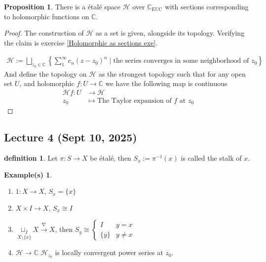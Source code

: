 \documentclass[10.5pt]{article}
\theoremstyle{definition}
\newtheorem{proposition}{Proposition}
\newtheorem{definition}{definition}
\newtheorem*{example}{Example(s)}
\newcommand{\set}[1]{\{#1\}}
\begin{document}
    \begin{proposition}\label{Holomorphic as sections}
            There is a \'etal\'e space \(\mathcal{H}\) over \(\mathbb{C}_\text{EUC}\) with sections corresponding to holomorphic functions on \(\mathbb{C}\).
    \end{proposition}
    \begin{proof}
        The construction of \(\mathcal{H}\) as a set is given, alongside its topology. Verifying the claim is exercise \ref{Holomorphic as sections exe}.
        
        \begin{align*}
            \mathcal{H} := \bigsqcup_{z_0 \in \mathbb{C}}\left\{\sum_1^\infty c_n(z-z_0)^n \mid \text{the series converges in some neighborhood of }z_0\right\}
        \end{align*}
        And define the topology on \(\mathcal{H}\) as the strongest topology such that for any open set \(U\), and holomorphic \(f: U \to \mathbb{C}\) we have the following map is continuous
        \begin{align*}
            \mathcal{H}f: U &\to \mathcal{H} \\
            z_0 &\mapsto \text{The Taylor expansion of }f \text{ at }z_0
        \end{align*}
    \end{proof}




    \subsection{Lecture 4 (Sept 10, 2025)}

    \begin{definition}
        Let \(\pi:S \to X\) be \'etal\'e, then \(S_x := \pi^{-1}(x)\) is called the stalk of \(x\).
    \end{definition}

    \begin{example}
        \begin{enumerate}
            \item \(1: X \to X\), \(S_x = \set{x}\)
            \item \(X \times I \to X\), \(S_x \cong I\)
            \item \(\underset{X \setminus \set{x}}{\sqcup_I} X \overset{\nabla}{\longrightarrow} X\), then \(S_y \cong \begin{cases}
                I & y=x\\ \set{\overline{y}} & y\neq x
            \end{cases}\)
            \item \(\mathcal{H} \to \mathbb{C}\) \(\mathcal{H}_{z_0}\) is locally convergent power series at \(z_0\).
        \end{enumerate}
    \end{example}
\end{document}
